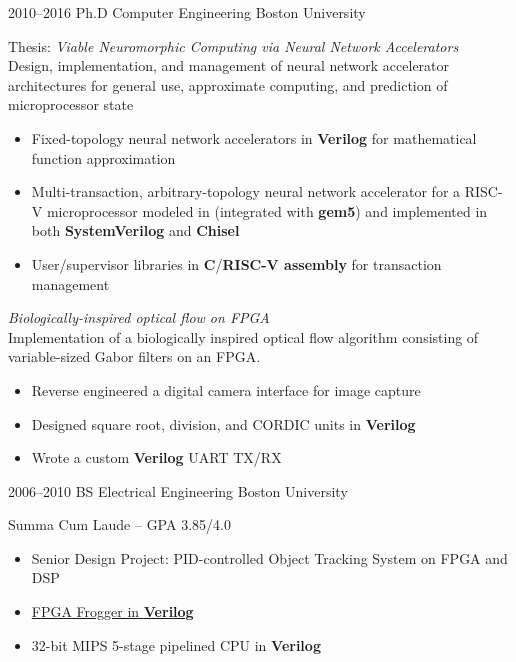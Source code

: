 \documentclass[]{friggeri-cv} %
\begin{document}
\begin{entrylist}


\entry
{2010--2016}
{Ph.D {\normalfont Computer Engineering}}
{Boston University}
{Thesis: \emph{Viable Neuromorphic Computing via Neural Network Accelerators} \\
  Design, implementation, and management of neural network accelerator architectures for general use, approximate computing, and prediction of microprocessor state
  \begin{itemize}
  \item Fixed-topology neural network accelerators in \textbf{Verilog} for mathematical function approximation
  \item Multi-transaction, arbitrary-topology neural network accelerator for a RISC-V microprocessor modeled in \textbf{\CPP} (integrated with \textbf{gem5}) and implemented in both \textbf{SystemVerilog} and \textbf{Chisel}
  \item User/supervisor libraries in \textbf{C}/\textbf{RISC-V assembly} for transaction management
  \end{itemize}
  \emph{Biologically-inspired optical flow on FPGA} \\
  Implementation of a biologically inspired optical flow algorithm consisting of variable-sized Gabor filters on an FPGA.
  \begin{itemize}
  \item Reverse engineered a digital camera interface for image capture
  \item Designed square root, division, and CORDIC units in \textbf{Verilog}
  \item Wrote a custom \textbf{Verilog} UART TX/RX
  \end{itemize}
}


\entry
{2006--2010}
{BS {\normalfont Electrical Engineering}}
{Boston University}
{Summa Cum Laude -- GPA 3.85/4.0
  \begin{itemize}
  \item Senior Design Project: PID-controlled Object Tracking System on FPGA and DSP
  \item \href{https://www.youtube.com/watch?v=S2LgUL5JLqQ}{FPGA Frogger in \textbf{Verilog}}
  \item 32-bit MIPS 5-stage pipelined CPU in \textbf{Verilog}
  \end{itemize}
}


\end{entrylist}
\end{document}

